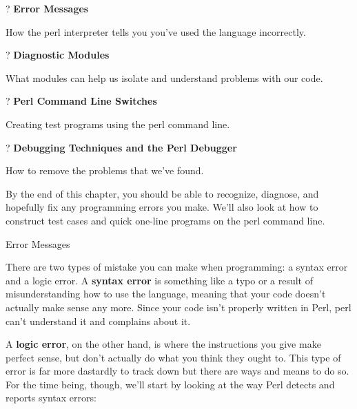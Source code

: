 \documentclass[a4paper,11pt]{book}
\begin{document}
\noindent 

\noindent ? \textbf{Error Messages}

\noindent How the perl interpreter tells you you've used the language incorrectly.

\noindent 

\noindent ? \textbf{Diagnostic Modules}

\noindent What modules can help us isolate and understand problems with our code.

\noindent 

\noindent ? \textbf{Perl Command Line Switches}

\noindent Creating test programs using the perl command line.

\noindent 

\noindent ? \textbf{Debugging Techniques and the Perl Debugger}

\noindent How to remove the problems that we've found.

\noindent 

\noindent By the end of this chapter, you should be able to recognize, diagnose, and hopefully fix any programming errors you make. We'll also look at how to construct test cases and quick one-line programs on the perl command line.

\noindent  

\noindent  

\noindent  

\noindent  

\noindent 

\noindent Error Messages

\noindent 

\noindent There are two types of mistake you can make when programming: a syntax error and a logic error. A \textbf{syntax error }is something like a typo or a result of misunderstanding how to use the language, meaning that your code doesn't actually make sense any more. Since your code isn't properly written in Perl, perl can't understand it and complains about it.

\noindent 

\noindent A \textbf{logic error}, on the other hand, is where the instructions you give make perfect sense, but don't actually do what you think they ought to. This type of error is far more dastardly to track down but there are ways and means to do so. For the time being, though, we'll start by looking at the way Perl detects and reports syntax errors:

\noindent 
\end{document}
